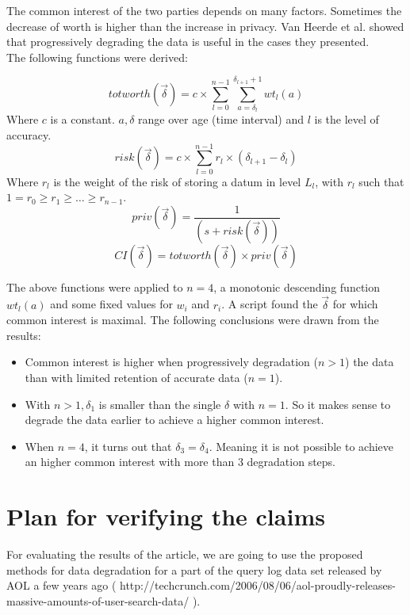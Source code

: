 \documentclass[a4paper,12pt,oneside,fleqn]{article}
\begin{document}
The common interest of the two parties depends on many
factors. Sometimes the decrease of worth is higher than the increase
in privacy. Van Heerde et al. showed that progressively degrading the
data is useful in the cases they presented.\\

The following functions were derived:

\[
    totworth(\vec\delta) = c \times \sum_{l=0}^{n-1}
    \sum_{a=\delta_l}^{\delta_{l+1} + 1} wt_l(a)
\]
Where $c$ is a constant. $a,\delta$ range over age (time interval) and
$l$ is the level of accuracy.
\[
    risk(\vec\delta) = c \times \sum_{l=0}^{n-1} r_l \times
    (\delta_{l+1} - \delta_l)
\]
Where $r_l$ is the weight of the risk of storing a datum in level
$L_l$, with $r_l$ such that $1 = r_0 \geq r_1 \geq \ldots \geq
r_{n-1}$.
\[
    priv(\vec\delta) = \frac{1}{(s + risk(\vec\delta))}
\]
\[
    CI(\vec\delta) = totworth(\vec\delta) \times priv(\vec\delta)
\]

The above functions were applied to $n = 4$, a monotonic descending
function $wt_l(a)$ and some fixed values for $w_i$ and $r_i$. A script
found the $\vec\delta$ for which common interest is maximal.  The
following conclusions were drawn from the results:

\begin{itemize}
    \item Common interest is higher when progressively degradation ($n
      > 1$) the data than with limited retention of accurate data
      ($n=1$).

    \item With $n > 1, \delta_1$ is smaller than the single $\delta$
      with $n =1$. So it makes sense to degrade the data earlier to
      achieve a higher common interest.

    \item When $n = 4$, it turns out that $\delta_3 =
      \delta_4$. Meaning it is not possible to achieve an higher
      common interest with more than 3 degradation steps.
\end{itemize}

\section{Plan for verifying the claims}

For evaluating the results of the article, we are going to use the
proposed methods for data degradation for a part of the query log data
set released by AOL a few years ago (
http://techcrunch.com/2006/08/06/aol-proudly-releases-massive-amounts-of-user-search-data/
).\\
\end{document}
